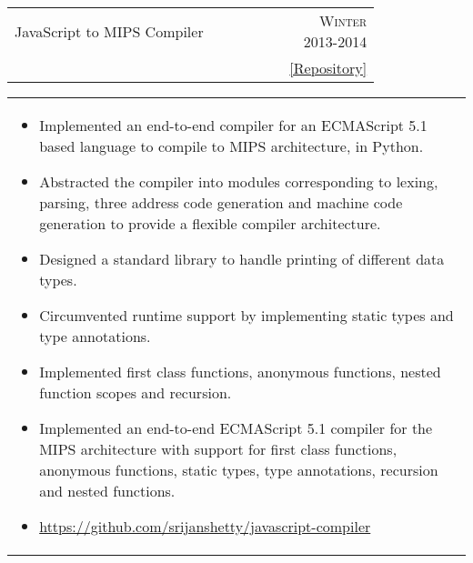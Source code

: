 \documentclass[a4paper,10pt]{article} %
\newcommand{\cproject}[5]{
    \begin{tabular}{p{0.80\linewidth}r}
        \textcolor{NavyBlue}{#2} & \multicolumn{1}{m{4cm}}{\raggedleft \textsc{#1}}\\
        #3 & #4
    \end{tabular}
    \begin{tabular}{p{\linewidth}}
    \vspace{-0.3cm}
        \footnotesize{#5}
    \end{tabular}
    \vspace{-0.5cm}
}
\begin{document}
\cproject {Winter 2013-2014}
          {JavaScript to MIPS Compiler}
          {\textsc{\raggedright Compilers}, Professor Subhajit Roy}
          { \href{https://github.com/srijanshetty/javascript-compiler} { \footnotesize{[Repository]}} }
          {
              \begin{itemize}[leftmargin=0.5cm]
                  \item Implemented an end-to-end compiler for an ECMAScript 5.1 based language to compile to MIPS
                      architecture, in Python.
                  \item Abstracted the compiler into modules corresponding to lexing, parsing, three address code generation
                      and machine code generation to provide a flexible compiler architecture.
                  \item Designed a standard library to handle printing of different data types.
                  \item Circumvented runtime support by implementing static types and type annotations.
                  \item Implemented first class functions, anonymous functions, nested function scopes and recursion.
                  \item Implemented an end-to-end ECMAScript 5.1 compiler for the MIPS architecture with support for first class
                      functions, anonymous functions, static types, type annotations, recursion and nested functions.
                  \item \href{https://github.com/srijanshetty/javascript-compiler} {https://github.com/srijanshetty/javascript-compiler}
              \end{itemize}
          }
\end{document}
